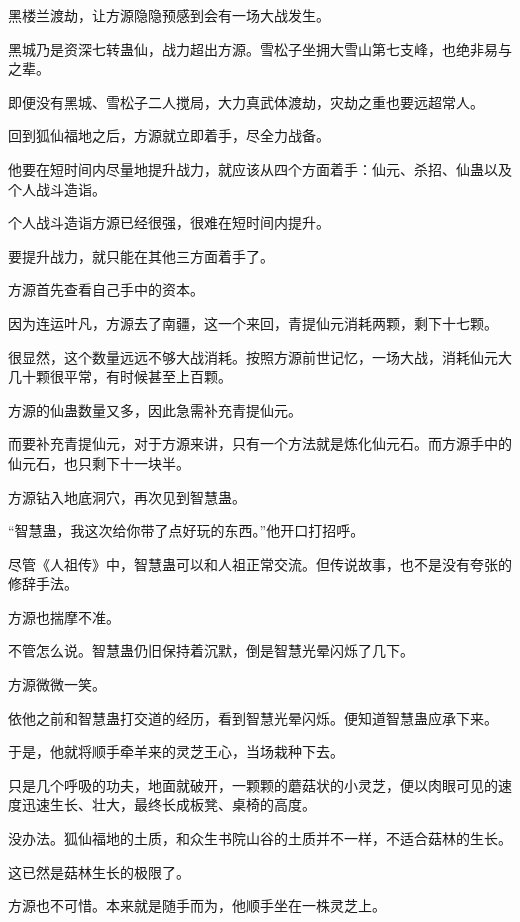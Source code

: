 
\begin{this_body}

黑楼兰渡劫，让方源隐隐预感到会有一场大战发生。

黑城乃是资深七转蛊仙，战力超出方源。雪松子坐拥大雪山第七支峰，也绝非易与之辈。

即便没有黑城、雪松子二人搅局，大力真武体渡劫，灾劫之重也要远超常人。

回到狐仙福地之后，方源就立即着手，尽全力战备。

他要在短时间内尽量地提升战力，就应该从四个方面着手：仙元、杀招、仙蛊以及个人战斗造诣。

个人战斗造诣方源已经很强，很难在短时间内提升。

要提升战力，就只能在其他三方面着手了。

方源首先查看自己手中的资本。

因为连运叶凡，方源去了南疆，这一个来回，青提仙元消耗两颗，剩下十七颗。

很显然，这个数量远远不够大战消耗。按照方源前世记忆，一场大战，消耗仙元大几十颗很平常，有时候甚至上百颗。

方源的仙蛊数量又多，因此急需补充青提仙元。

而要补充青提仙元，对于方源来讲，只有一个方法就是炼化仙元石。而方源手中的仙元石，也只剩下十一块半。

方源钻入地底洞穴，再次见到智慧蛊。

“智慧蛊，我这次给你带了点好玩的东西。”他开口打招呼。

尽管《人祖传》中，智慧蛊可以和人祖正常交流。但传说故事，也不是没有夸张的修辞手法。

方源也揣摩不准。

不管怎么说。智慧蛊仍旧保持着沉默，倒是智慧光晕闪烁了几下。

方源微微一笑。

依他之前和智慧蛊打交道的经历，看到智慧光晕闪烁。便知道智慧蛊应承下来。

于是，他就将顺手牵羊来的灵芝王心，当场栽种下去。

只是几个呼吸的功夫，地面就破开，一颗颗的蘑菇状的小灵芝，便以肉眼可见的速度迅速生长、壮大，最终长成板凳、桌椅的高度。

没办法。狐仙福地的土质，和众生书院山谷的土质并不一样，不适合菇林的生长。

这已然是菇林生长的极限了。

方源也不可惜。本来就是随手而为，他顺手坐在一株灵芝上。


\end{this_body}
